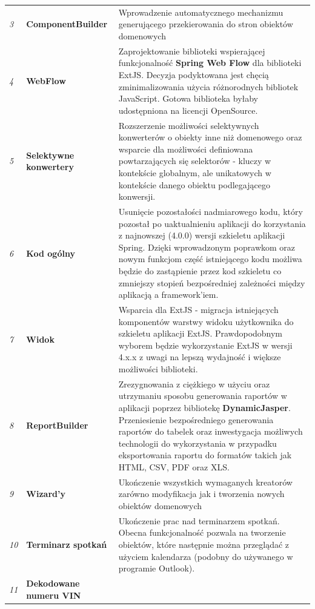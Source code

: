 \begin{center}
\begin{longtable}{|l|l|p{10cm}|}
			\emph{3}					&
			\textbf{ComponentBuilder}	&
			Wprowadzenie automatycznego mechanizmu generującego przekierowania do stron obiektów domenowych
										\tabularnewline
										
			\emph{4}					&
			\textbf{WebFlow}			&
			Zaprojektowanie biblioteki wspierającej 
			funkcjonalność \textbf{Spring Web Flow} dla biblioteki ExtJS. Decyzja podyktowana jest 
			chęcią zminimalizowania użycia różnorodnych bibliotek JavaScript. Gotowa biblioteka
			byłaby udostępniona na licencji OpenSource.
										\tabularnewline
			\emph{5}						&
			\textbf{Selektywne konwertery}	&
			Rozszerzenie możliwości selektywnych konwerterów o obiekty inne niż domenowego oraz
			wsparcie dla możliwości definiowana powtarzających się selektorów - kluczy w kontekście
			globalnym, ale unikatowych w kontekście danego obiektu podlegającego konwersji.
										\tabularnewline
			\emph{6}						&
			\textbf{Kod ogólny}				&
			Usunięcie pozostałości nadmiarowego kodu, który pozostał po uaktualnieniu aplikacji
			do korzystania z najnowszej (4.0.0) wersji szkieletu aplikacji Spring. Dzięki wprowadzonym 
			poprawkom oraz nowym funkcjom część istniejącego kodu możliwa będzie do zastąpienie
			przez kod szkieletu co zmniejszy stopień bezpośredniej zależności między aplikacją a framework'iem.
											\tabularnewline
			\emph{7}						&
			\textbf{Widok}					&
			Wsparcia dla ExtJS - migracja istniejących komponentów warstwy widoku użytkownika do 
			szkieletu aplikacji ExtJS. Prawdopodobnym wyborem będzie wykorzystanie ExtJS w wersji 4.x.x z uwagi
			na lepszą wydajność i większe możliwości biblioteki. 
											\tabularnewline
			\emph{8}						&
			\textbf{ReportBuilder}			&
			Zrezygnowania z ciężkiego w użyciu oraz utrzymaniu sposobu generowania raportów w aplikacji poprzez
			bibliotekę \textbf{DynamicJasper}. Przeniesienie bezpośredniego generowania raportów do tabelek oraz
			inwestygacja możliwych technologii do wykorzystania w przypadku eksportowania raportu do formatów takich jak
			HTML, CSV, PDF oraz XLS.		
											\tabularnewline		
			\emph{9}						&
			\textbf{Wizard'y}				&
			Ukończenie wszystkich wymaganych kreatorów zarówno modyfikacja jak i tworzenia nowych obiektów domenowych	
											\tabularnewline	
			\emph{10}						&
			\textbf{Terminarz spotkań}		&
			Ukończenie prac nad terminarzem spotkań. Obecna funkcjonalność pozwala na tworzenie obiektów, które następnie
			można przeglądać z użyciem kalendarza (podobny do używanego w programie Outlook). 	
											\tabularnewline		
			\emph{11}						&
			\textbf{Dekodowane numeru VIN}		&

\end{longtable}
\end{center}
